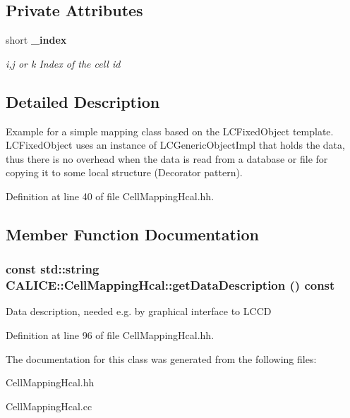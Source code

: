 \subsection*{Private Attributes}
\begin{DoxyCompactItemize}
\item 
short {\bf \_\-index}\label{classCALICE_1_1CellMappingHcal_ac042db1cac41c0a080364c6ed8e6e4f5}

\begin{DoxyCompactList}\small\item\em i,j or k Index of the cell id \item\end{DoxyCompactList}\end{DoxyCompactItemize}


\subsection{Detailed Description}
Example for a simple mapping class based on the LCFixedObject template. LCFixedObject uses an instance of LCGenericObjectImpl that holds the data, thus there is no overhead when the data is read from a database or file for copying it to some local structure (Decorator pattern).\par
 

Definition at line 40 of file CellMappingHcal.hh.

\subsection{Member Function Documentation}
\subsubsection[{getDataDescription}]{\setlength{\rightskip}{0pt plus 5cm}const std::string CALICE::CellMappingHcal::getDataDescription () const\hspace{0.3cm}{\ttfamily  [inline]}}\label{classCALICE_1_1CellMappingHcal_a703c49c4ee36f2faf9ff744afc9bf098}


Data description, needed e.g. by graphical interface to LCCD 

Definition at line 96 of file CellMappingHcal.hh.

The documentation for this class was generated from the following files:\begin{DoxyCompactItemize}
\item 
CellMappingHcal.hh\item 
CellMappingHcal.cc\end{DoxyCompactItemize}
